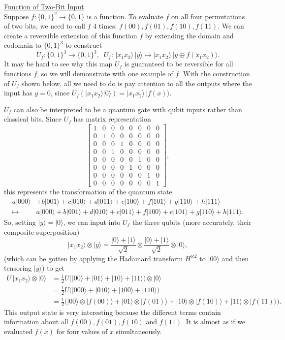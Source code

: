 \documentclass{article}
\theoremstyle{definition}
\begin{document}
\underline{Function of Two-Bit Input}\\
Suppose $f: \{0, 1\}^2 \longrightarrow \{0, 1\}$ is a function. To evaluate $f$ on all four permutations of two bits, we need to call $f$ 4 times: $f(00), f(01), f(10), f(11)$. We can create a reversible extension of this function $f$ by extending the domain and codomain to $\{0, 1\}^3$ to construct
\[U_f: \{0, 1\}^3 \longrightarrow \{0, 1\}^3, \;\; U_f: \, |x_1 x_2 \rangle\,|y\rangle \mapsto |x_1 x_2 \rangle\, |y \oplus f(x_1 x_2) \rangle.\]
It may be hard to see why this map $U_f$ is guaranteed to be reversible for all functions $f$, so we will demonstrate with one example of $f$. With the construction of $U_f$ shown below, all we need to do is pay attention to all the outputs where the input has $y=0$, since $U_f (|x_1 x_2 \rangle |0\rangle) = |x_1 x_2 \rangle \, |f(x) \rangle$.

$U_f$ can also be interpreted to be a quantum gate with qubit inputs rather than classical bits. Since $U_f$ has matrix representation
\[\begin{bmatrix} 1&0&0&0&0&0&0&0\\0&1&0&0&0&0&0&0\\0&0&0&1&0&0&0&0\\0&0&1&0&0&0&0&0\\0&0&0&0&0&1&0&0\\0&0&0&0&1&0&0&0\\0&0&0&0&0&0&1&0\\0&0&0&0&0&0&0&1 \end{bmatrix},\]
this represents the transformation of the quantum state
\begin{align*}
  a|000\rangle & + b|001\rangle + c|010\rangle + d |011\rangle + e|100\rangle + f |101\rangle + g|110\rangle + h|111\rangle \\
  \mapsto & a|000\rangle + b|001\rangle + d|010\rangle + c |011\rangle + f|100\rangle + e |101\rangle + g |110\rangle + h|111\rangle.
\end{align*}
So, setting $|y\rangle = |0\rangle$, we can input into $U_f$ the three qubits (more accurately, their composite superposition)
\[|x_1 x_2 \rangle \otimes |y\rangle = \frac{|0\rangle + |1\rangle}{\sqrt{2}} \otimes \frac{|0\rangle + |1\rangle}{\sqrt{2}} \otimes |0\rangle, \]
(which can be gotten by applying the Hadamard transform $H^{\otimes 2}$ to $|00\rangle$ and then tensoring $|y\rangle$) to get
\begin{align*}
  U\,|x_1 x_2 \rangle \otimes |0\rangle & = \frac{1}{2} U \big( |00\rangle + |01\rangle + |10\rangle + |11\rangle \big) \otimes |0\rangle \\
  & = \frac{1}{2} U \big(|000\rangle + |010\rangle + |100\rangle + |110\rangle \big) \\
  & = \frac{1}{2} \big( |00\rangle \otimes |f(00)\rangle + |01\rangle \otimes |f(01)\rangle + |10\rangle \otimes |f(10)\rangle + |11\rangle \otimes |f(11)\rangle \big).
\end{align*}
This output state is very interesting because the different terms contain information about all $f(00), f(01), f(10)$ and $f(11)$. It is almost as if we evaluated $f(x)$ for four values of $x$ simultaneously.
\end{document}
